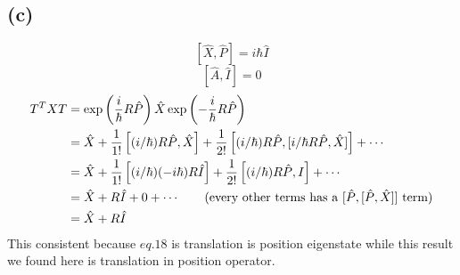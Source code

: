 \documentclass[letter]{article}
\newcommand{\hb}{\hbar}
\begin{document}
\subsection*{(c)}
\[
	[\hat{X}, \hat{P} ] = i \hb \hat{I}
\]
\[
[ \hat{A} , \hat{I} ] = 0 \]  
\begin{align*}
	T^{T} X T &= 
	\exp\left(
\frac{i}{\hb} R \hat{P}
	\right)
	\hat{X}
	\exp\left(
-\frac{i}{\hb} R \hat{P}
	\right)  \\ 
		  &= 
\hat{X} + 
	\frac{1}{1!} \left[ (i / \hb )R \hat{P}, \hat{X} \right]   + 
	\frac{1}{2!} \left[ (i / \hb) R \hat{P}, [ i / \hb R \hat{P} , \hat{X} ] \right] + \cdots \\
	&= 
\hat{X} + 
\frac{1}{1!} 
\left[
	(i / \hb) (- i \hb ) R  \hat{I}
\right]
+
\frac{1}{2!}\left[
	(i / \hb ) R \hat{P} , I 
\right] + \cdots  
	\\
	&= 
	\hat{X} + R \hat{I} + 0 + \cdots  \tag{every other terms has a $[\hat{P}, [\hat{P}, \hat{X} ]] $ term}
	\\
	&= 
\hat{X} + R \hat{I}
	\\
\end{align*}
This consistent because $eq. 18$ is translation is position eigenstate while this result we found here is translation in position operator. 
\end{document}
